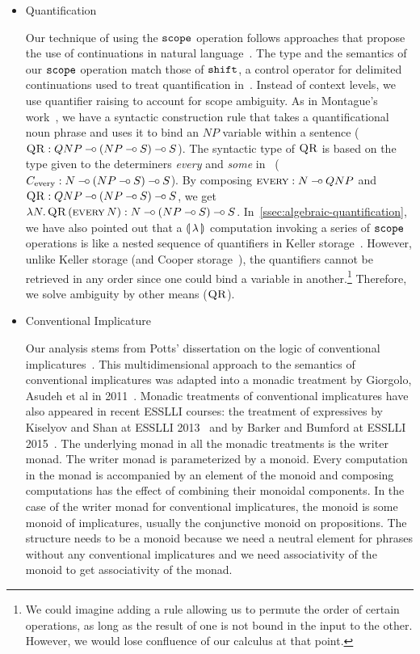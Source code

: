 \begin{itemize}
\item Quantification 

  Our technique of using the $\mathtt{scope}$ operation follows approaches that
  propose the use of continuations in natural
  language~\cite{de2001type,barker2002continuations}. The type and the
  semantics of our $\mathtt{scope}$ operation match those of $\mathtt{shift}$, a
  control operator for delimited continuations used to treat quantification
  in~\cite{shan2005linguistic}. Instead of context levels, we use
  quantifier raising to account for scope ambiguity. As in Montague's
  work~\cite{montague1973proper}, we have a syntactic construction rule
  that takes a quantificational noun phrase and uses it to bind an $NP$
  variable within a sentence ($\textsc{QR} : QNP \mathbin{{-}\mkern-3.5mu{\circ}} (NP \mathbin{{-}\mkern-3.5mu{\circ}} S) \mathbin{{-}\mkern-3.5mu{\circ}}
  S$). The syntactic type of $\textsc{QR}$ is based on the type given to the
  determiners \emph{every} and \emph{some}
  in~\cite{pogodalla2007generalizing}
  ($C_{\text{every}} : N \mathbin{{-}\mkern-3.5mu{\circ}} (NP \mathbin{{-}\mkern-3.5mu{\circ}} S) \mathbin{{-}\mkern-3.5mu{\circ}} S$). By composing
  $\textsc{every} : N \mathbin{{-}\mkern-3.5mu{\circ}} QNP$ and
  $\textsc{QR} : QNP \mathbin{{-}\mkern-3.5mu{\circ}} (NP \mathbin{{-}\mkern-3.5mu{\circ}} S) \mathbin{{-}\mkern-3.5mu{\circ}} S$, we get
  $\lambda N.\, \textsc{QR}\,(\textsc{every}\,N) : N \mathbin{{-}\mkern-3.5mu{\circ}} (NP \mathbin{{-}\mkern-3.5mu{\circ}} S)
  \mathbin{{-}\mkern-3.5mu{\circ}} S$. In~\ref{ssec:algebraic-quantification}, we have also pointed
  out that a ${\llparenthesis \, \lambda \, \rrparenthesis}$ computation invoking a series of $\mathtt{scope}$
  operations is like a nested sequence of quantifiers in Keller
  storage~\cite{keller1988nested}. However, unlike Keller storage (and
  Cooper storage~\cite{cooper1979montague}), the quantifiers cannot be
  retrieved in any order since one could bind a variable in
  another.\footnote{We could imagine adding a rule allowing us to permute
    the order of certain operations, as long as the result of one is not
    bound in the input to the other. However, we would lose confluence of
    our calculus at that point.} Therefore, we solve ambiguity by other
  means ($\textsc{QR}$).


\item Conventional Implicature

  Our analysis stems from Potts' dissertation on the logic of conventional
  implicatures~\cite{potts2005logic}. This multidimensional approach to the
  semantics of conventional implicatures was adapted into a monadic
  treatment by Giorgolo, Asudeh et al in
  2011~\cite{giorgolo2011multidimensional,giorgolo2012monads}. Monadic
  treatments of conventional implicatures have also appeared in recent
  ESSLLI courses: the treatment of expressives by Kiselyov and Shan at
  ESSLLI 2013~\cite{kiselyov2010lambda} and by Barker and Bumford at ESSLLI
  2015~\cite{barker2015monads}. The underlying monad in all the monadic
  treatments is the writer monad. The writer monad is parameterized by a
  monoid. Every computation in the monad is accompanied by an element of
  the monoid and composing computations has the effect of combining their
  monoidal components. In the case of the writer monad for conventional
  implicatures, the monoid is some monoid of implicatures, usually the
  conjunctive monoid on propositions. The structure needs to be a monoid
  because we need a neutral element for phrases without any conventional
  implicatures and we need associativity of the monoid to get associativity
  of the monad.


\end{itemize}
